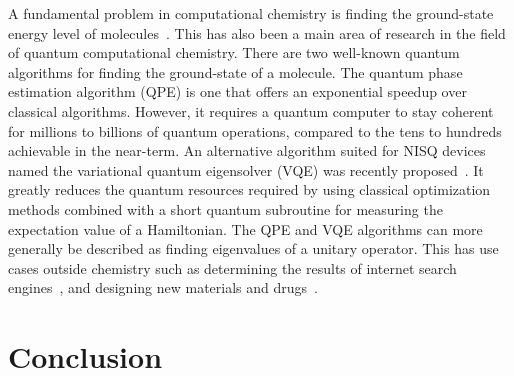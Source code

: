\documentclass[twocolumn, switch]{article}
\begin{document}
    A fundamental problem in computational chemistry is finding the ground-state energy level of molecules~\cite{aspuru2005simulated}.
    This has also been a main area of research in the field of quantum computational chemistry.
    There are two well-known quantum algorithms for finding the ground-state of a molecule.
    The quantum phase estimation algorithm (QPE) is one that offers an exponential speedup over classical algorithms.
    However, it requires a quantum computer to stay coherent for millions to billions of quantum operations, compared to the tens to hundreds achievable in the near-term.
    An alternative algorithm suited for NISQ devices named the variational quantum eigensolver (VQE) was recently proposed~\cite{vqe}.
    It greatly reduces the quantum resources required by using classical optimization methods combined with a short quantum subroutine for measuring the expectation value of a Hamiltonian.
    The QPE and VQE algorithms can more generally be described as finding eigenvalues of a unitary operator.
    This has use cases outside chemistry such as determining the results of internet search engines~\cite{page1999pagerank}, and designing new materials and drugs~\cite{golub2000eigenvalue}.
    
    \section{Conclusion} \label{sec:conclusion}
    
    \printbibliography
\end{document}
